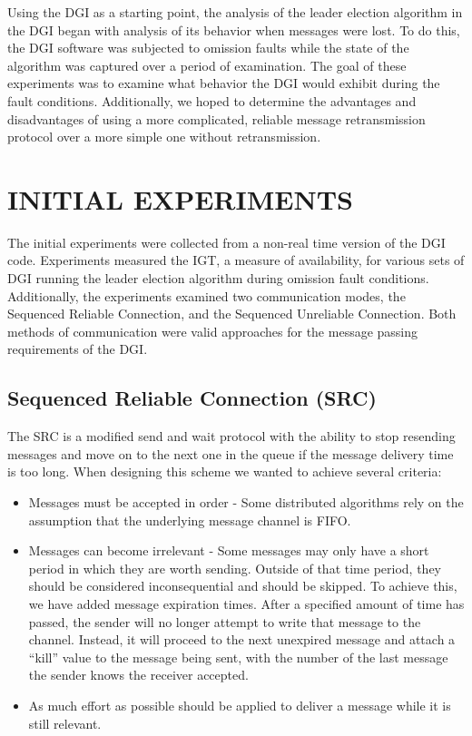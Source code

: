 Using the DGI as a starting point, the analysis of the leader election algorithm in the DGI began with analysis of its behavior when messages were lost.
To do this, the DGI software was subjected to omission faults while the state of the algorithm was captured over a period of examination.
The goal of these experiments was to examine what behavior the DGI would exhibit during the fault conditions.
Additionally, we hoped to determine the advantages and disadvantages of using a more complicated, reliable message retransmission protocol over a more simple one without retransmission.

\section{INITIAL EXPERIMENTS}

The initial experiments were collected from a non-real time version of the DGI code.
Experiments measured the \ac{IGT}, a measure of availability, for various sets of DGI running the leader election algorithm during omission fault conditions.
Additionally, the experiments examined two communication modes, the Sequenced Reliable Connection, and the Sequenced Unreliable Connection.
Both methods of communication were valid approaches for the message passing requirements of the DGI.

\subsection{Sequenced Reliable Connection (SRC)}

The \ac{SRC} is a modified send and wait protocol with the ability to stop resending messages and move on to the next one in the queue if the message delivery time is too long. When designing this scheme we wanted to achieve several criteria:

\begin{itemize}
\item Messages must be accepted in order - Some distributed algorithms rely on the assumption that the underlying message channel is FIFO.
\item Messages can become irrelevant - Some messages may only have a short period in which they are worth sending. Outside of that time period, they should be considered inconsequential and should be skipped. To achieve this, we have added message expiration times. After a specified amount of time has passed, the sender will no longer attempt to write that message to the channel. Instead, it will proceed to the next unexpired message and attach a ``kill'' value to the message being sent, with the number of the last message the sender knows the receiver accepted.
\item As much effort as possible should be applied to deliver a message while it is still relevant.
\end{itemize}

